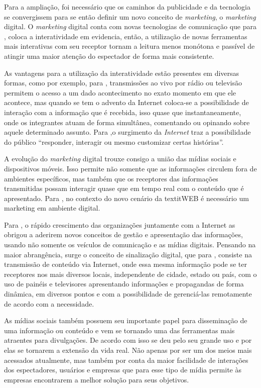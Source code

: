 Para a ampliação, foi necessário que os caminhos da publicidade e da tecnologia se convergissem para se então definir um novo conceito de \textit{marketing}, o \textit{marketing} digital. O \textit{marketing} digital conta com novas tecnologias de comunicação que para \cite[p.2]{escobar2007}, coloca a interatividade em evidencia, então, a utilização de novas ferramentas mais interativas com seu receptor tornam a leitura menos monótona e passível de atingir uma maior atenção do espectador de forma mais consistente.  

As vantagens para a utilização da interatividade estão presentes em diversas formas, como por exemplo, para \cite[p.4]{escobar2007}, transmissões ao vivo por rádio ou televisão permitem o acesso a um dado acontecimento no exato momento em que ele acontece, mas quando se tem o advento da Internet coloca-se a possibilidade de interação com a informação que é recebida, isso quase que instantaneamente, onde os integrantes atuam de forma simultânea, comentando ou opinando sobre aquele determinado assunto. Para \cite{deuze2002},o surgimento da \textit{Internet} traz a possibilidade do público ``responder, interagir ou mesmo customizar certas histórias''. 

A evolução do \textit{marketing} digital trouxe consigo a união das mídias sociais e dispositivos móveis. Isso permite não somente que as informações circulem fora de ambientes específicos, mas também que os receptores das informações transmitidas possam interagir quase que em tempo real com o conteúdo que é apresentado. Para \cite{santos2014}, no contexto do novo cenário da textit{WEB} é necessário um marketing em ambiente digital.

Para \cite[p.7]{machado2010}, o rápido crescimento das organizações juntamente com a Internet as obrigou a aderirem novos conceitos de gestão e apresentação das informações, usando não somente os veículos de comunicação e as mídias digitais. Pensando na maior abrangência, surge o conceito de sinalização digital, que para \cite[p.37]{machado2010}, consiste na transmissão de conteúdo via Internet, onde essa mesma informação pode se ter receptores nos mais diversos locais, independente de cidade, estado ou país, com o uso de painéis e televisores apresentando informações e propagandas de forma dinâmica, em diversos pontos e com a possibilidade de gerenciá-las remotamente de acordo com a necessidade. 

As mídias sociais também possuem seu importante papel para disseminação de uma informação ou conteúdo e vem se tornando uma das ferramentas mais atraentes para divulgações. De acordo com \cite{rosa2010} isso se deu pelo seu grande uso e por elas se tornarem a extensão da vida real. Não apenas por ser um dos meios mais acessados atualmente, mas também por conta da maior facilidade de interações dos espectadores, usuários e empresas que para \cite{rosa2010} esse tipo de mídia permite 
às empresas encontrarem a melhor solução para seus objetivos. 

